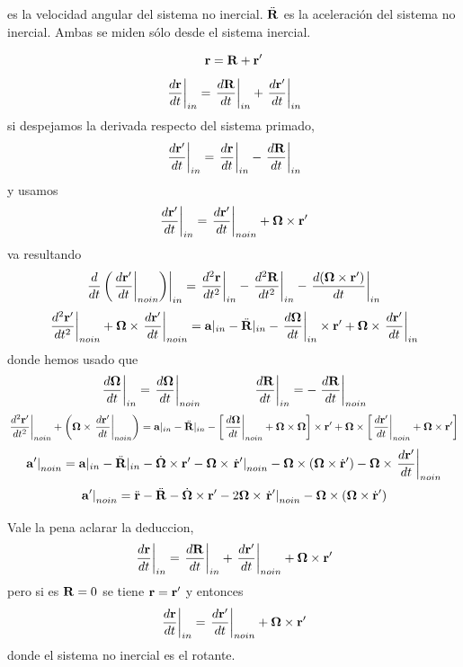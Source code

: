 \documentclass[10pt,oneside]{CBFT_book}
\begin{document}
\vb{\Omega} es la velocidad angular del sistema no inercial. $\ddot{\vb{R}}$ es la aceleración del 
sistema no inercial. Ambas se miden sólo desde el sistema inercial.

\[
	\vb{r} = \vb{R} + \vb{r}'
\]
\[
	\left.\dtot{\vb{r}}{t}\right|_{in} =
			\left.\dtot{\vb{R}}{t}\right|_{in} + \left.\dtot{\vb{r}'}{t}\right|_{in}
\]
si despejamos la derivada respecto del sistema primado,
\[
	\left.\dtot{\vb{r}'}{t}\right|_{in} = \left.\dtot{\vb{r}}{t}\right|_{in} 
				- \left.\dtot{\vb{R}}{t}\right|_{in}
\]
y usamos 
\[
	\left.\dtot{\vb{r}'}{t}\right|_{in} = \left.\dtot{\vb{r}'}{t}\right|_{no in} +
				\vb{\Omega} \times \vb{r}'
\]
va resultando 
\[
	\left. \frac{d}{dt}\left( {\left.\dtot{\vb{r}'}{t}\right|_{no in}} \right) \right|_{in}  =  
			\left.\dtot[2]{\vb{r}}{t}\right|_{in}  - \left.\dtot[2]{\vb{R}}{t}\right|_{in} 
			- \left. \dtot{(\vb{\Omega} \times \vb{r}')}{t}\right|_{in}
\]
\[
	\left.\dtot[2]{\vb{r}'}{t}\right|_{no in}  + \vb{\Omega} \times \left.\dtot{\vb{r}'}{t}\right|_{no in}
		 = \vb{a}|_{in} - \ddot{\vb{R}}|_{in} - \left. \dtot{\vb{\Omega}}{t}\right|_{in} \times \vb{r}' 
				+ \vb{\Omega} \times \left. \dtot{ \vb{r}'}{t}\right|_{in}
\]
donde hemos usado que 
\[
	\left. \dtot{\vb{\Omega}}{t} \right|_{in} = \left. \dtot{\vb{\Omega}}{t} \right|_{no in} \qquad \qquad
	\left. \dtot{\vb{R}}{t} \right|_{in} = - \left. \dtot{\vb{R}}{t} \right|_{no in}
\]
\[
	\left.\dtot[2]{\vb{r}'}{t}\right|_{no in}  + \left( \vb{\Omega} \times \left.\dtot{\vb{r}'}{t}\right|_{no in} \right)
		 = \vb{a}|_{in} - \ddot{\vb{R}}|_{in} 
		 - \left[\left. \dtot{\vb{\Omega}}{t}\right|_{no in} + \vb{\Omega} \times \vb{\Omega} \right] \times \vb{r}' 
		+ \vb{\Omega} \times \left[ \left. \dtot{ \vb{r}'}{t}\right|_{no in} + \vb{\Omega} \times \vb{r}' \right]
\]
\[
	\left. \vb{a}'\right|_{no in}   = \vb{a}|_{in} - \ddot{\vb{R}}|_{in} 
		 - \dot{\vb{\Omega}} \times \vb{r}'  -  \vb{\Omega} \times \left.\dot{\vb{r}}' \right|_{no in} 
		- \vb{\Omega} \times \left( \vb{\Omega} \times \dot{\vb{r}}' \right) 
		- \vb{\Omega} \times  \left. \dtot{ \vb{r}'}{t}\right|_{no in} 
\]
\[
	\left. \vb{a}'\right|_{no in}  = \ddot{\vb{r}}  - \ddot{\vb{R}}
		 - \dot{\vb{\Omega}} \times \vb{r}'  -  2 \vb{\Omega} \times \left.\dot{\vb{r}}' \right|_{no in} 
		- \vb{\Omega} \times \left( \vb{\Omega} \times \dot{\vb{r}}' \right)
\]

Vale la pena aclarar la deduccion,
\[
	\left. \dtot{\vb{r}}{t} \right|_{in} = \left. \dtot{\vb{R}}{t} \right|_{in} + \left. \dtot{\vb{r}'}{t} \right|_{no in}
	+ \vb{\Omega} \times \vb{r}' 
\]
pero si es $\vb{R}=0$ se tiene $\vb{r}=\vb{r}'$ y entonces
\[
	\left. \dtot{\vb{r}}{t} \right|_{in} =  \left. \dtot{\vb{r}'}{t} \right|_{no in} + \vb{\Omega} \times \vb{r}' 
\]
donde el sistema no inercial es el rotante.
\end{document}
